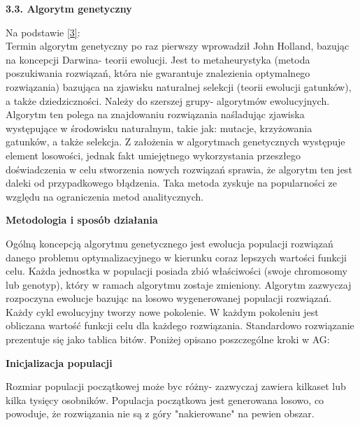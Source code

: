 \documentclass[a4paper, twoside, 12pt, justified]{article}
\begin{document}
	\begin{flushleft}
		\begin{large}
			\textbf{3.3. Algorytm genetyczny}
		\end{large}
	\end{flushleft}
	\vspace{5mm} %
	
	Na podstawie \hyperlink{ag}{[3]}:\\
	Termin algorytm genetyczny po raz pierwszy wprowadził John Holland, bazując na koncepcji Darwina- teorii ewolucji. Jest to metaheurystyka (metoda poszukiwania rozwiązań, która nie gwarantuje znalezienia optymalnego rozwiązania) bazująca na zjawisku naturalnej selekcji (teorii ewolucji gatunków), a także dziedziczności. Należy do szerszej grupy- algorytmów ewolucyjnych. Algorytm ten polega na znajdowaniu rozwiązania naśladując zjawiska występujące w środowisku naturalnym, takie jak: mutacje, krzyżowania gatunków, a także selekcja. Z założenia w algorytmach genetycznych występuje element losowości, jednak fakt umiejętnego wykorzystania przeszłego doświadczenia w celu stworzenia nowych rozwiązań sprawia, że algorytm ten jest daleki od przypadkowego błądzenia. Taka metoda zyskuje na popularności ze względu na ograniczenia metod analitycznych.\\
	
	\begin{large}
		\begin{center}
			\textbf{Metodologia i sposób działania}
		\end{center}
	\end{large}
	
	Ogólną koncepcją algorytmu genetycznego jest ewolucja populacji rozwiązań danego problemu optymalizacyjnego w kierunku coraz lepszych wartości funkcji celu. Każda jednostka w populacji posiada zbió właściwości (swoje chromosomy lub genotyp), który w ramach algorytmu zostaje zmieniony. Algorytm zazwyczaj rozpoczyna ewolucje bazując na losowo wygenerowanej populacji rozwiązań. Każdy cykl ewolucyjny tworzy nowe pokolenie. W każdym pokoleniu jest obliczana wartość funkcji celu dla każdego rozwiązania. Standardowo rozwiązanie prezentuje się jako tablica bitów. Poniżej opisano poszczególne kroki w AG:\\
	
	\begin{center}
		\textbf{Inicjalizacja populacji}
	\end{center}
	
	Rozmiar populacji początkowej może byc różny- zazwyczaj zawiera kilkaset lub kilka tysięcy osobników. Populacja początkowa jest generowana losowo, co powoduje, że rozwiązania nie są z góry "nakierowane" na pewien obszar.
	
\end{document}
